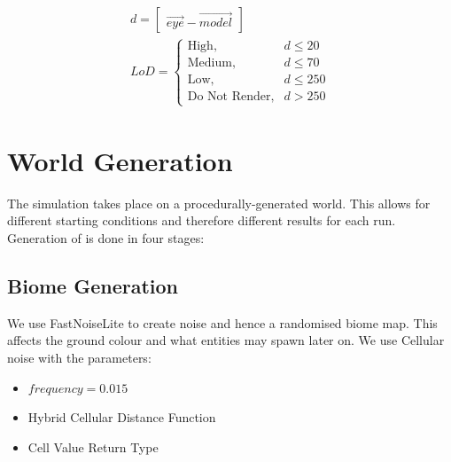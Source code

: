 \documentclass{article}
\begin{document}
\begin{multicols}{2}
                    \[
                        \begin{array}{l}
                            d = \begin{bmatrix}
                                \vec{eye} - \vec{model}
                            \end{bmatrix} \\
                            LoD = \begin{cases}
                                \text{High}, &d \leq 20 \\
                                \text{Medium}, &d \leq 70 \\
                                \text{Low}, &d \leq 250 \\
                                \text{Do Not Render}, &d > 250
                            \end{cases}
                        \end{array}
                    \]


        
        \section{World Generation}
        The simulation takes place on a procedurally-generated world. This allows for different starting conditions and therefore different results for each run.
        Generation of is done in four stages:
        
        \subsection{Biome Generation}
        
        We use FastNoiseLite \cite{FastNoiseLite} to create noise and hence a randomised biome map. This affects the ground colour and what entities may spawn later on. We use Cellular noise with the parameters:

        \begin{itemize}
            \setlength\itemsep{0.01em}
            \item $frequency = 0.015$
            \item Hybrid Cellular Distance Function
            \item Cell Value Return Type
        \end{itemize}
        

\end{multicols}
\end{document}
